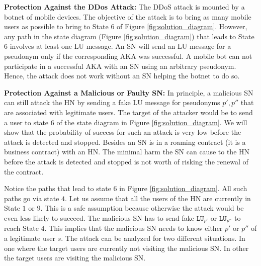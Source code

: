 \documentclass{llncs} %
\begin{document}
\textbf{Protection Against the DDos Attack:} The DDoS attack is mounted by a botnet of mobile devices. The objective of the attack is to bring as many mobile users as possible to bring to State $6$ of Figure \ref{fig:solution_diagram}. However, any path in the state diagram (Figure \ref{fig:solution_diagram}) that leads to State $6$ involves at least one LU message. An SN will send an LU message for a pseudonym only if the corresponding AKA was successful. A mobile bot can not participate in a successful AKA with an SN using an arbitrary pseudonym. Hence, the attack does not work without an SN helping the botnet to do so.


\textbf{Protection Against a Malicious or Faulty SN:} In principle, a malicious SN can still attack the HN by sending a fake LU message for pseudonyms $p',p''$ that are associated with legitimate users. The target of the attacker would be to send a user to state $6$ of the state diagram in Figure \ref{fig:solution_diagram}. We will show that the probability of success for such an attack is very low before the attack is detected and stopped. Besides an SN is in a roaming contract (it is a business contract) with an HN. The minimal harm the SN can cause to the HN before the attack is detected and stopped is not worth of risking the renewal of the contract.

Notice the paths that lead to state $6$ in Figure \ref{fig:solution_diagram}. All such paths go via state $4$. Let us assume that all the users of the HN are currently in State $1$ or $9$. This is a safe assumption because otherwise the attack would be even less likely to succeed. The malicious SN has to send fake $\texttt{LU}_{p'}$ or $\texttt{LU}_{p''}$ to reach State $4$. This implies that the malicious SN needs to know either $p'$ or $p''$ of a legitimate user $s$. The attack can be analyzed for two different situations. In one where the target users are currently not visiting the malicious SN. In other the target users are visiting the malicious SN.
\end{document}
